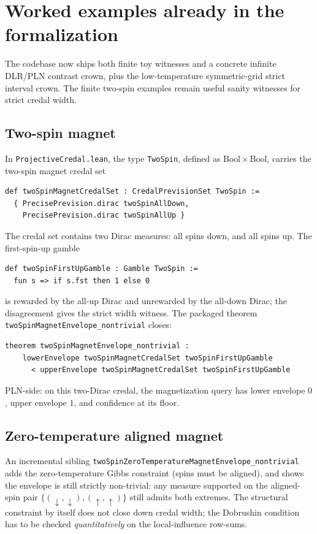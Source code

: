 \documentclass[]{article}
\newcommand{\lid}[1]{{\ttfamily\nolinkurl{#1}}}
\newcommand{\lpath}[1]{\texttt{\nolinkurl{#1}}}
\begin{document}
\section{Worked examples already in the formalization}\label{sec:examples}

The codebase now ships both finite toy witnesses and a concrete infinite
DLR/PLN contrast crown, plus the low-temperature symmetric-grid strict
interval crown. The finite two-spin examples remain useful sanity witnesses
for strict credal width.

\subsection{Two-spin magnet}

In \lpath{ProjectiveCredal.lean}, the type
\lid{TwoSpin}, defined as $\mathrm{Bool} \times \mathrm{Bool}$, carries the two-spin
magnet credal set
\begin{lstlisting}
def twoSpinMagnetCredalSet : CredalPrevisionSet TwoSpin :=
  { PrecisePrevision.dirac twoSpinAllDown,
    PrecisePrevision.dirac twoSpinAllUp }
\end{lstlisting}
The credal set contains two Dirac measures: all spins down, and all
spins up. The first-spin-up gamble
\begin{lstlisting}
def twoSpinFirstUpGamble : Gamble TwoSpin :=
  fun s => if s.fst then 1 else 0
\end{lstlisting}
is rewarded by the all-up Dirac and unrewarded by the all-down Dirac;
the disagreement gives the strict width witness. The packaged theorem
\lid{twoSpinMagnetEnvelope\_nontrivial} closes:
\begin{lstlisting}
theorem twoSpinMagnetEnvelope_nontrivial :
    lowerEnvelope twoSpinMagnetCredalSet twoSpinFirstUpGamble
      < upperEnvelope twoSpinMagnetCredalSet twoSpinFirstUpGamble
\end{lstlisting}
PLN-side: on this two-Dirac credal, the magnetization query has lower
envelope $0$, upper envelope $1$, and confidence at its floor.

\subsection{Zero-temperature aligned magnet}

An incremental sibling
\lid{twoSpinZeroTemperatureMagnetEnvelope\_nontrivial} adds the
zero-temperature Gibbs constraint (spins must be aligned), and shows
the envelope is still strictly non-trivial: any measure supported on
the aligned-spin pair $\{(\downarrow,\downarrow), (\uparrow,\uparrow)\}$
still admits both extremes. The structural constraint by itself does
not close down credal width; the Dobrushin condition has to be checked
\emph{quantitatively} on the local-influence row-sums.
\end{document}
